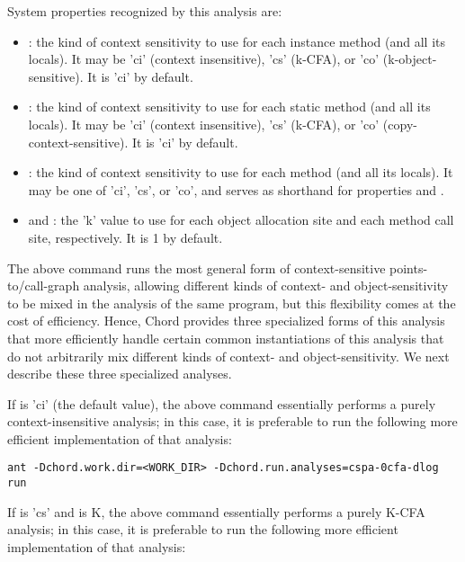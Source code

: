 System properties recognized by this analysis are:
\begin{itemize}
\item
{}: the kind of context sensitivity to use for each
instance method (and all its locals).  It may be 'ci' (context insensitive), 'cs'
(k-CFA), or 'co' (k-object-sensitive).  It is 'ci' by default.
\item
{}: the kind of context sensitivity to use for each
static method (and all its locals).  It may be 'ci' (context insensitive), 'cs'
(k-CFA), or 'co' (copy-context-sensitive).  It is 'ci' by default.
\item
{}: the kind of context sensitivity to use for each method
(and all its locals).  It may be one of 'ci', 'cs', or 'co', and serves as
shorthand for properties  and .
\item
{} and : the 'k' value to use for each object
allocation site and each method call site, respectively.
It is 1 by default.
\end{itemize}

The above command runs the most general form of context-sensitive
points-to/call-graph analysis,
allowing different kinds of context- and object-sensitivity to be mixed in the analysis of
the same program, but this flexibility comes at the cost of efficiency.
Hence, Chord provides three specialized forms of this analysis that more
efficiently handle certain common instantiations of this analysis that do not
arbitrarily mix different kinds of context- and object-sensitivity.  We next describe these
three specialized analyses.

If  is 'ci' (the default value),
the above command essentially performs a purely context-insensitive
analysis; in this case, it is preferable to run the following more efficient
implementation of that analysis:

\begin{framed}
\begin{verbatim}
ant -Dchord.work.dir=<WORK_DIR> -Dchord.run.analyses=cspa-0cfa-dlog run
\end{verbatim}
\end{framed}

If  is 'cs' and  is K,
the above command essentially performs a purely K-CFA analysis; in this case, it
is preferable to run the following more efficient implementation of that
analysis:

